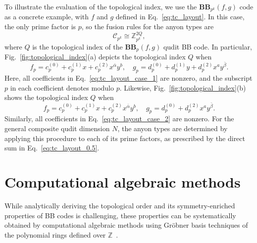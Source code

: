 \documentclass[aps,prb,english,superscriptaddress,twocolumn,tightenlines,showpacs,longbibliography,floatfix,amsfonts]{revtex4-2}
\begin{document}
To illustrate the evaluation of the topological index, we use the $\mathbf{BB}_{p^k}(f,g)$ code as a concrete example, with $f$ and $g$ defined in Eq.~\eqref{eq:tc_layout}. In this case, the only prime factor is $p$, so the fusion rules for the anyon types are
\begin{equation}
    \mathcal{C}_{p^k}\cong \mathbb{Z}_{p^k}^{2Q},
\end{equation}
where $Q$ is the topological index of the $\mathbf{BB}_{p}(f,g)$ qudit BB code. In particular, Fig.~\ref{fig:topological_index}(a) depicts the topological index $Q$ when
\begin{equation}
    f_p=c^{(0)}_p+c^{(1)}_px+c^{(2)}_px^{\bar{\alpha}}y^{b},\quad g_p=d^{(0)}_p+d^{(1)}_py+d^{(2)}_px^{a}y^{\bar{\beta}}.\label{eq:tc_layout_case_1}
\end{equation}
Here, all coefficients in Eq.~\eqref{eq:tc_layout_case_1} are nonzero, and the subscript $p$ in each coefficient denotes modulo $p$. Likewise, Fig.~\ref{fig:topological_index}(b) shows the topological index $Q$ when
\begin{equation}
f_p=c^{(0)}_p+c^{(1)}_px+c^{(2)}_px^{\bar{\alpha}}y^{b},\quad g_p=d^{(0)}_p+d^{(2)}_px^{a}y^{\bar{\beta}}.\label{eq:tc_layout_case_2}
\end{equation}
Similarly, all coefficients in Eq.~\eqref{eq:tc_layout_case_2} are nonzero. For the general composite qudit dimension 
$N$, the anyon types are determined by applying this procedure to each of its prime factors, as prescribed by the direct sum in Eq.~\eqref{eq:tc_layout_0.5}.
\section{Computational algebraic methods\label{sec7}}
While analytically deriving the topological order and its symmetry-enriched properties of BB codes is challenging, these properties can be systematically obtained by computational algebraic methods using Gr\"{o}bner basis techniques of the polynomial rings defined over $\mathbb{Z}$~\cite{Moller1988, Kandri-Rody1988, Becker1993, Adams1994}. 
\end{document}
